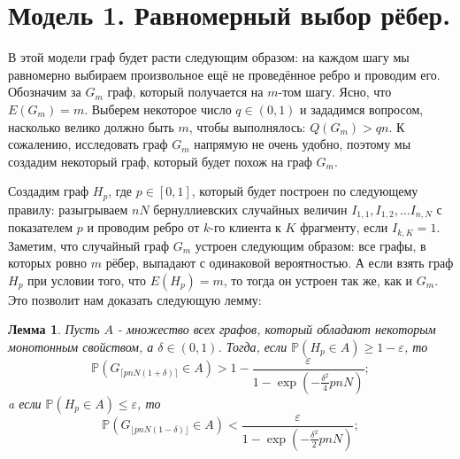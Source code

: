 \documentclass{matmex-diploma-custom}
\newcommand{\PRob}{\mathbb P}
\newcommand{\leqs}{\leqslant}
\newcommand{\geqs}{\geqslant}
\newcommand{\eps}{\varepsilon}
\newtheorem{lemma}{Лемма}
\theoremstyle{named}
\begin{document}
\section*{Модель 1. Равномерный выбор рёбер.}
В этой модели граф будет расти следующим образом: на каждом шагу мы равномерно выбираем произвольное ещё не проведённое ребро 
и проводим его. Обозначим за $G_m$ граф, который получается на $m$-том шагу. Ясно, что $E(G_m) = m$.
Выберем некоторое число $q \in (0, 1)$ и зададимся вопросом, насколько велико должно быть $m$, чтобы выполнялось: $Q(G_m) > qn$.
К сожалению, исследовать граф $G_m$ напрямую не очень удобно, поэтому мы создадим некоторый граф, который будет похож на граф $G_m$.

Создадим граф $H_p$, где $p \in [0, 1]$, который будет построен по следующему правилу: 
разыгрываем $nN$ бернуллиевских случайных величин $I_{1,1}, I_{1,2}, \dots I_{n,N}$ с показателем $p$ и проводим ребро от $k$-го клиента к $K$ фрагменту, 
если $I_{k, K} = 1$.
Заметим, что случайный граф $G_m$ устроен следующим образом: все графы, в которых ровно $m$ рёбер, выпадают с одинаковой вероятностью.
А если взять граф $H_p$ при условии того, что $E(H_p) = m$, то тогда он устроен так же, как и $G_m$.
Это позволит нам доказать следующую лемму:

\begin{lemma} \label{l1}
Пусть $A$ - множество всех графов, который обладают некоторым монотонным свойством, а $\delta \in (0,1)$.
Тогда, если $\PRob( H_p \in A) \geqs 1 - \eps$, то
\begin{equation} \label{l1_1}
\PRob(G_{\lceil pnN(1+\delta) \rceil} \in A) > 1 - \frac{\eps}{1 - \exp\left(-\frac{\delta^2}{4}pnN\right)};
\end{equation}
a если $\PRob( H_p \in A) \leqs \eps$, то
\begin{equation}\label{l1_2}
\PRob(G_{\lfloor pnN(1-\delta) \rfloor} \in A) < \frac{\eps}{1 - \exp\left(-\frac{\delta^2}{2}pnN\right)};
\end{equation}
\end{lemma}
\end{document}
